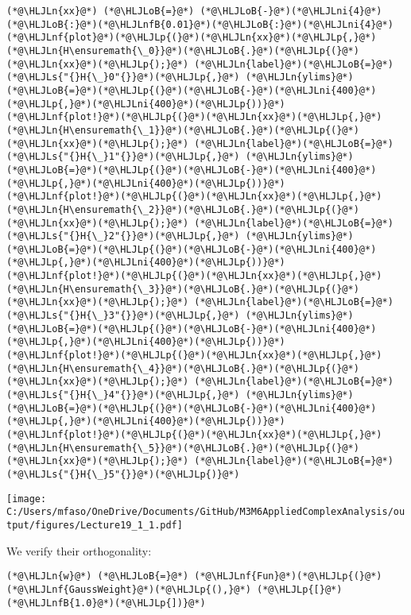 \documentclass[12pt,landscape]{article}
\newcommand{\HLJLn}[1]{#1}
\newcommand{\HLJLnf}[1]{\textcolor[RGB]{66,102,213}{#1}}
\newcommand{\HLJLs}[1]{\textcolor[RGB]{201,61,57}{#1}}
\newcommand{\HLJLnfB}[1]{\textcolor[RGB]{59,151,46}{#1}}
\newcommand{\HLJLni}[1]{\textcolor[RGB]{59,151,46}{#1}}
\newcommand{\HLJLoB}[1]{\textcolor[RGB]{102,102,102}{\textbf{#1}}}
\newcommand{\HLJLp}[1]{#1}
\def\cent#1{\begin{center}#1\end{center} }
\begin{document}
{\begin{lstlisting}
(*@\HLJLn{xx}@*) (*@\HLJLoB{=}@*) (*@\HLJLoB{-}@*)(*@\HLJLni{4}@*)(*@\HLJLoB{:}@*)(*@\HLJLnfB{0.01}@*)(*@\HLJLoB{:}@*)(*@\HLJLni{4}@*)
(*@\HLJLnf{plot}@*)(*@\HLJLp{(}@*)(*@\HLJLn{xx}@*)(*@\HLJLp{,}@*) (*@\HLJLn{H\ensuremath{\_0}}@*)(*@\HLJLoB{.}@*)(*@\HLJLp{(}@*)(*@\HLJLn{xx}@*)(*@\HLJLp{);}@*) (*@\HLJLn{label}@*)(*@\HLJLoB{=}@*)(*@\HLJLs{"{}H{\_}0"{}}@*)(*@\HLJLp{,}@*) (*@\HLJLn{ylims}@*)(*@\HLJLoB{=}@*)(*@\HLJLp{(}@*)(*@\HLJLoB{-}@*)(*@\HLJLni{400}@*)(*@\HLJLp{,}@*)(*@\HLJLni{400}@*)(*@\HLJLp{))}@*)
(*@\HLJLnf{plot!}@*)(*@\HLJLp{(}@*)(*@\HLJLn{xx}@*)(*@\HLJLp{,}@*) (*@\HLJLn{H\ensuremath{\_1}}@*)(*@\HLJLoB{.}@*)(*@\HLJLp{(}@*)(*@\HLJLn{xx}@*)(*@\HLJLp{);}@*) (*@\HLJLn{label}@*)(*@\HLJLoB{=}@*)(*@\HLJLs{"{}H{\_}1"{}}@*)(*@\HLJLp{,}@*) (*@\HLJLn{ylims}@*)(*@\HLJLoB{=}@*)(*@\HLJLp{(}@*)(*@\HLJLoB{-}@*)(*@\HLJLni{400}@*)(*@\HLJLp{,}@*)(*@\HLJLni{400}@*)(*@\HLJLp{))}@*)
(*@\HLJLnf{plot!}@*)(*@\HLJLp{(}@*)(*@\HLJLn{xx}@*)(*@\HLJLp{,}@*) (*@\HLJLn{H\ensuremath{\_2}}@*)(*@\HLJLoB{.}@*)(*@\HLJLp{(}@*)(*@\HLJLn{xx}@*)(*@\HLJLp{);}@*) (*@\HLJLn{label}@*)(*@\HLJLoB{=}@*)(*@\HLJLs{"{}H{\_}2"{}}@*)(*@\HLJLp{,}@*) (*@\HLJLn{ylims}@*)(*@\HLJLoB{=}@*)(*@\HLJLp{(}@*)(*@\HLJLoB{-}@*)(*@\HLJLni{400}@*)(*@\HLJLp{,}@*)(*@\HLJLni{400}@*)(*@\HLJLp{))}@*)
(*@\HLJLnf{plot!}@*)(*@\HLJLp{(}@*)(*@\HLJLn{xx}@*)(*@\HLJLp{,}@*) (*@\HLJLn{H\ensuremath{\_3}}@*)(*@\HLJLoB{.}@*)(*@\HLJLp{(}@*)(*@\HLJLn{xx}@*)(*@\HLJLp{);}@*) (*@\HLJLn{label}@*)(*@\HLJLoB{=}@*)(*@\HLJLs{"{}H{\_}3"{}}@*)(*@\HLJLp{,}@*) (*@\HLJLn{ylims}@*)(*@\HLJLoB{=}@*)(*@\HLJLp{(}@*)(*@\HLJLoB{-}@*)(*@\HLJLni{400}@*)(*@\HLJLp{,}@*)(*@\HLJLni{400}@*)(*@\HLJLp{))}@*)
(*@\HLJLnf{plot!}@*)(*@\HLJLp{(}@*)(*@\HLJLn{xx}@*)(*@\HLJLp{,}@*) (*@\HLJLn{H\ensuremath{\_4}}@*)(*@\HLJLoB{.}@*)(*@\HLJLp{(}@*)(*@\HLJLn{xx}@*)(*@\HLJLp{);}@*) (*@\HLJLn{label}@*)(*@\HLJLoB{=}@*)(*@\HLJLs{"{}H{\_}4"{}}@*)(*@\HLJLp{,}@*) (*@\HLJLn{ylims}@*)(*@\HLJLoB{=}@*)(*@\HLJLp{(}@*)(*@\HLJLoB{-}@*)(*@\HLJLni{400}@*)(*@\HLJLp{,}@*)(*@\HLJLni{400}@*)(*@\HLJLp{))}@*)
(*@\HLJLnf{plot!}@*)(*@\HLJLp{(}@*)(*@\HLJLn{xx}@*)(*@\HLJLp{,}@*) (*@\HLJLn{H\ensuremath{\_5}}@*)(*@\HLJLoB{.}@*)(*@\HLJLp{(}@*)(*@\HLJLn{xx}@*)(*@\HLJLp{);}@*) (*@\HLJLn{label}@*)(*@\HLJLoB{=}@*)(*@\HLJLs{"{}H{\_}5"{}}@*)(*@\HLJLp{)}@*)
\end{lstlisting}

\cent{\texttt{[image: C:/Users/mfaso/OneDrive/Documents/GitHub/M3M6AppliedComplexAnalysis/output/figures/Lecture19\_1\_1.pdf]}}

We verify their orthogonality:


\begin{lstlisting}
(*@\HLJLn{w}@*) (*@\HLJLoB{=}@*) (*@\HLJLnf{Fun}@*)(*@\HLJLp{(}@*)(*@\HLJLnf{GaussWeight}@*)(*@\HLJLp{(),}@*) (*@\HLJLp{[}@*)(*@\HLJLnfB{1.0}@*)(*@\HLJLp{])}@*)


\end{lstlisting}}
\end{document}
